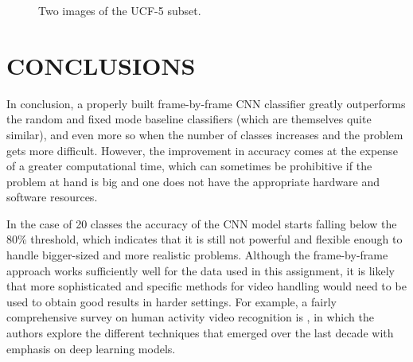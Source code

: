 \documentclass[letterpaper, 10 pt, conference]{IEEEtran}
\begin{document}
\begin{figure}[h!]
    \centering
    \caption{Two images of the UCF-5 subset.}
    \label{fig:example}
\end{figure}

\section{CONCLUSIONS}

In conclusion, a properly built frame-by-frame CNN classifier greatly outperforms the random and fixed mode baseline classifiers (which are themselves quite similar), and even more so when the number of classes increases and the problem gets more difficult. However, the improvement in accuracy comes at the expense of a greater computational time, which can sometimes be prohibitive if the problem at hand is big and one does not have the appropriate hardware and software resources.

In the case of 20 classes the accuracy of the CNN model starts falling below the 80\% threshold, which indicates that it is still not powerful and flexible enough to handle bigger-sized and more realistic problems. Although the frame-by-frame approach works sufficiently well for the data used in this assignment, it is likely that more sophisticated and specific methods for video handling would need to be used to obtain good results in harder settings. For example, a fairly comprehensive survey on human activity video recognition is \cite{survey}, in which the authors explore the different techniques that emerged over the last decade with emphasis on deep learning models.
\end{document}

